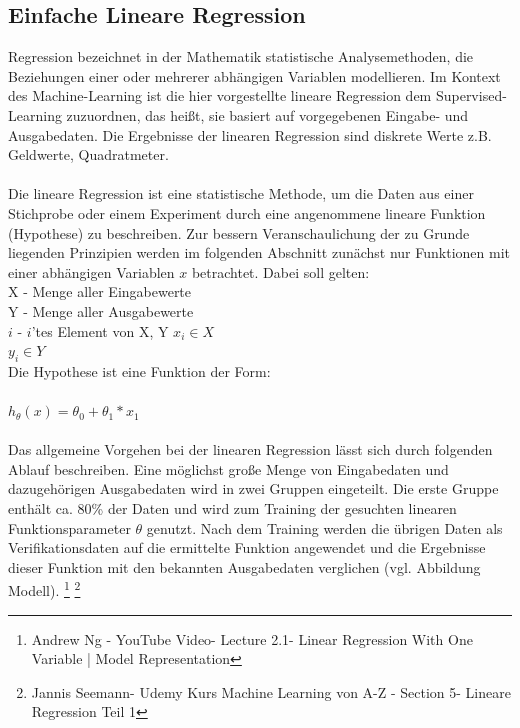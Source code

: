 \documentclass[a4paper]{scrreprt}
\begin{document}
\subsection{Einfache Lineare Regression}
Regression bezeichnet in der Mathematik statistische Analysemethoden, die Beziehungen einer oder mehrerer abhängigen Variablen modellieren. Im Kontext des Machine-Learning ist die hier vorgestellte lineare Regression dem Supervised-Learning zuzuordnen, das heißt, sie basiert auf vorgegebenen Eingabe- und Ausgabedaten. Die Ergebnisse der linearen Regression sind diskrete Werte z.B. Geldwerte, Quadratmeter.\\\\
Die lineare Regression ist eine statistische Methode, um die Daten aus einer Stichprobe oder einem Experiment durch eine angenommene lineare Funktion (Hypothese) zu beschreiben.
Zur bessern Veranschaulichung der zu Grunde liegenden Prinzipien werden im folgenden Abschnitt zunächst nur Funktionen mit einer abhängigen Variablen $x$ betrachtet. Dabei soll gelten: \\
X - Menge aller Eingabewerte\\
Y - Menge aller Ausgabewerte\\
$i$ - $i$'tes Element von X, Y
$x_i \in X$\\
$y_i \in Y$\\
Die Hypothese ist eine Funktion der Form:\\\\
$h_{\theta}(x)=\theta_{0}+\theta_{1}*x_{1}$ \\\\
Das allgemeine Vorgehen bei der linearen Regression lässt sich durch folgenden Ablauf beschreiben. Eine möglichst große Menge von Eingabedaten und dazugehörigen Ausgabedaten wird in zwei Gruppen eingeteilt. Die erste Gruppe enthält ca. 80\% der Daten und wird zum Training der gesuchten linearen Funktionsparameter ${\theta}$ genutzt. Nach dem Training werden die übrigen Daten als Verifikationsdaten auf die ermittelte Funktion angewendet und die Ergebnisse dieser Funktion mit den bekannten Ausgabedaten verglichen (vgl. Abbildung Modell).
\footnote{Andrew Ng - YouTube Video- Lecture 2.1- Linear Regression With One Variable | Model Representation}
\footnote{Jannis Seemann- Udemy Kurs Machine Learning von A-Z - Section 5- Lineare Regression Teil 1}
\end{document}
